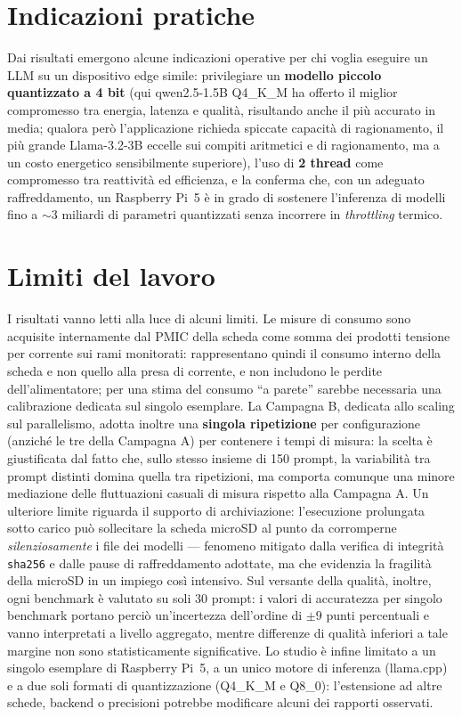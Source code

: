 \section{Indicazioni pratiche}

Dai risultati emergono alcune indicazioni operative per chi voglia eseguire un LLM
su un dispositivo edge simile: privilegiare un \textbf{modello piccolo
quantizzato a 4 bit} (qui qwen2.5-1.5B Q4\_K\_M ha offerto il miglior compromesso
tra energia, latenza e qualità, risultando anche il più accurato in media; qualora
però l'applicazione richieda spiccate capacità di ragionamento, il più grande
Llama-3.2-3B eccelle sui compiti aritmetici e di ragionamento, ma a un costo
energetico sensibilmente superiore), l'uso di \textbf{2 thread} come compromesso tra
reattività ed efficienza, e la conferma che, con un adeguato raffreddamento, un
Raspberry Pi~5 è in grado di sostenere l'inferenza di modelli fino a $\sim$3
miliardi di parametri quantizzati senza incorrere in \textit{throttling} termico.

\section{Limiti del lavoro}

I risultati vanno letti alla luce di alcuni limiti. Le misure di consumo sono
acquisite internamente dal PMIC della scheda come somma dei prodotti tensione per
corrente sui rami monitorati: rappresentano quindi il consumo interno della
scheda e non quello alla presa di corrente, e non includono le perdite
dell'alimentatore; per una stima del consumo ``a parete'' sarebbe necessaria una
calibrazione dedicata sul singolo esemplare. La Campagna B, dedicata allo scaling
sul parallelismo, adotta inoltre una \textbf{singola ripetizione} per configurazione
(anziché le tre della Campagna A) per contenere i tempi di misura: la scelta è
giustificata dal fatto che, sullo stesso insieme di 150 prompt, la variabilità tra
prompt distinti domina quella tra ripetizioni, ma comporta comunque una minore
mediazione delle fluttuazioni casuali di misura rispetto alla Campagna A. Un ulteriore
limite riguarda il supporto di archiviazione: l'esecuzione prolungata sotto carico
può sollecitare la scheda microSD al punto da corromperne \emph{silenziosamente} i
file dei modelli --- fenomeno mitigato dalla verifica di integrità \texttt{sha256} e
dalle pause di raffreddamento adottate, ma che evidenzia la fragilità della microSD
in un impiego così intensivo. Sul versante della qualità, inoltre, ogni benchmark è
valutato su soli 30 prompt: i valori di accuratezza per singolo benchmark
portano perciò un'incertezza dell'ordine di $\pm 9$ punti percentuali e vanno
interpretati a livello aggregato, mentre differenze di qualità inferiori a tale
margine non sono statisticamente significative. Lo studio
è infine limitato a un singolo esemplare di Raspberry Pi~5, a
un unico motore di inferenza (llama.cpp) e a due soli formati di quantizzazione
(Q4\_K\_M e Q8\_0): l'estensione ad altre schede, backend o precisioni potrebbe
modificare alcuni dei rapporti osservati.

